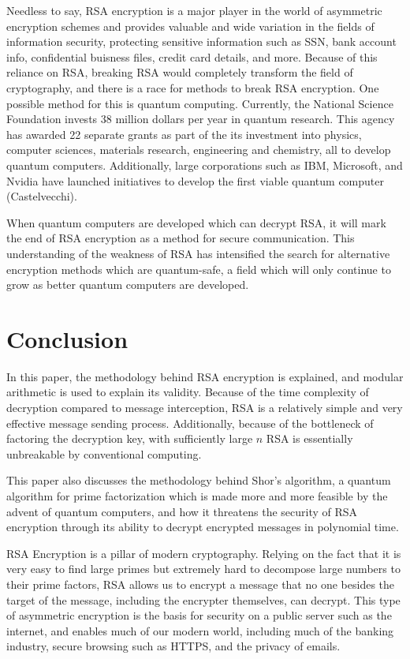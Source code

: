 \documentclass{article}
\begin{document}
Needless to say, RSA encryption is a major player in the world of asymmetric encryption schemes and provides valuable and wide variation in the fields of information security, protecting sensitive information such as SSN, bank account info, confidential buisness files, credit card details, and more. Because of this reliance on RSA, breaking RSA would completely transform the field of cryptography, and there is a race for methods to break RSA encryption. One possible method for this is quantum computing. Currently, the National Science Foundation invests 38 million dollars per year in quantum research. This agency has awarded 22 separate grants as part of the its investment into physics, computer sciences, materials research, engineering and chemistry, all to develop quantum computers. Additionally, large corporations such as IBM, Microsoft, and Nvidia have launched initiatives to develop the first viable quantum computer (Castelvecchi). 

When quantum computers are developed which can decrypt RSA, it will mark the end of RSA encryption as a method for secure communication. This understanding of the weakness of RSA has intensified the search for alternative encryption methods which are quantum-safe, a field which will only continue to grow as better quantum computers are developed.

\section{Conclusion}
In this paper, the methodology behind RSA encryption is explained, and modular arithmetic is used to explain its validity. Because of the time complexity of decryption compared to message interception, RSA is a relatively simple and very effective message sending process. Additionally, because of the bottleneck of factoring the decryption key, with sufficiently large $n$ RSA is essentially unbreakable by conventional computing.

This paper also discusses the methodology behind Shor's algorithm, a quantum algorithm for prime factorization which is made more and more feasible by the advent of quantum computers, and how it threatens the security of RSA encryption through its ability to decrypt encrypted messages in polynomial time.

RSA Encryption is a pillar of modern cryptography. Relying on the fact that it is very easy to find large primes but extremely hard to decompose large numbers to their prime factors, RSA allows us to encrypt a message  that no one besides the target of the message, including the encrypter themselves, can decrypt. This type of asymmetric encryption is the basis for security on a public server such as the internet, and enables much of our modern world, including much of the banking industry, secure browsing such as HTTPS, and the privacy of emails. 
\end{document}

